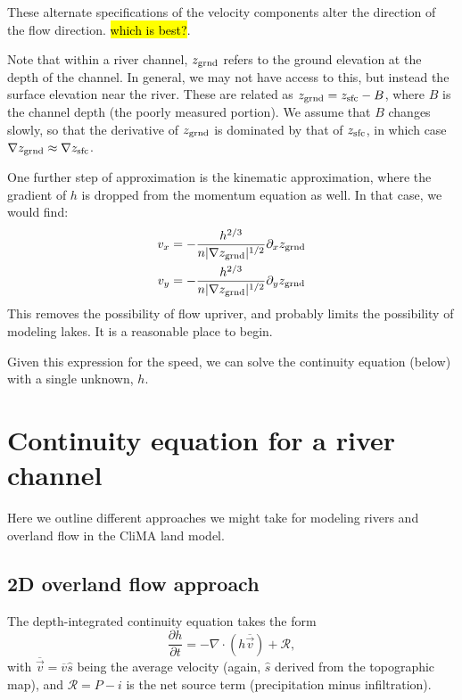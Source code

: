 \documentclass[twoside,10pt]{report}
\begin{document}
These alternate specifications of the velocity components alter the direction of the flow direction. \hl{which is best?}.

Note that within a river channel, $z_{\rm grnd}$ refers to the ground elevation at the depth of the channel. In general, we may not have access to this, but instead the surface elevation near the river. These are related as $z_{\rm grnd} = z_{\rm sfc}-B$, where $B$ is the channel depth (the poorly measured portion). We assume that $B$ changes slowly, so that the derivative of $z_{\rm grnd}$ is dominated by that of $z_{\rm sfc}$, in which case $\nabla z_{\rm grnd} \approx \nabla z_{\rm sfc}$.


One further step of approximation is the kinematic approximation, where the gradient of $h$ is dropped from the momentum equation as well. In that case, we would find:
\begin{align}\label{vel_kinematic}
     v_x & = -\frac{h^{2/3}}{n|\nabla z_{\rm grnd}|^{1/2}} \partial_x z_{\rm grnd} \nonumber \\
    v_y & =-\frac{h^{2/3}}{n|\nabla z_{\rm grnd}|^{1/2}} \partial_y z_{\rm grnd}
\end{align}
This removes the possibility of flow upriver, and probably limits the possibility of modeling lakes. It is a reasonable place to begin.


Given this expression for the speed, we can solve the continuity equation (below) with a single unknown, $h$.



\section{Continuity equation for a river channel}
Here we outline different approaches we might take for modeling rivers and overland flow in the CliMA land model.

\subsection{2D overland flow approach}
The depth-integrated continuity equation takes the form
\begin{equation}
    \frac{\partial h}{\partial t} = -\nabla \cdot (h \overline{\vec{v}}) + \mathcal{R},
\end{equation}
with $\overline{\vec{v}} = \overline{v}\hat{s}$ being the average velocity (again, $\hat{s}$ derived from the topographic map), and $\mathcal{R} = P - i$ is the net source term (precipitation minus infiltration).
\end{document}
